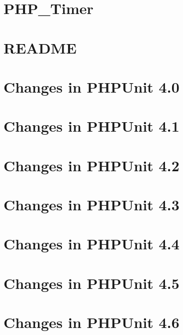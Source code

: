 \documentclass[twoside]{book}
\newcommand{\+}{\discretionary{\mbox{\scriptsize$\hookleftarrow$}}{}{}}
\begin{document}
\chapter{P\+H\+P\+\_\+\+Timer}
\label{md_vendor_phpunit_php-timer__r_e_a_d_m_e}

\chapter{R\+E\+A\+D\+M\+E}
\label{md_vendor_phpunit_php-token-stream__r_e_a_d_m_e}

\chapter{Changes in P\+H\+P\+Unit 4.0}
\label{md_vendor_phpunit_phpunit__change_log-4_80}

\chapter{Changes in P\+H\+P\+Unit 4.1}
\label{md_vendor_phpunit_phpunit__change_log-4_81}

\chapter{Changes in P\+H\+P\+Unit 4.2}
\label{md_vendor_phpunit_phpunit__change_log-4_82}

\chapter{Changes in P\+H\+P\+Unit 4.3}
\label{md_vendor_phpunit_phpunit__change_log-4_83}

\chapter{Changes in P\+H\+P\+Unit 4.4}
\label{md_vendor_phpunit_phpunit__change_log-4_84}

\chapter{Changes in P\+H\+P\+Unit 4.5}
\label{md_vendor_phpunit_phpunit__change_log-4_85}

\chapter{Changes in P\+H\+P\+Unit 4.6}
\label{md_vendor_phpunit_phpunit__change_log-4_86}

\end{document}
